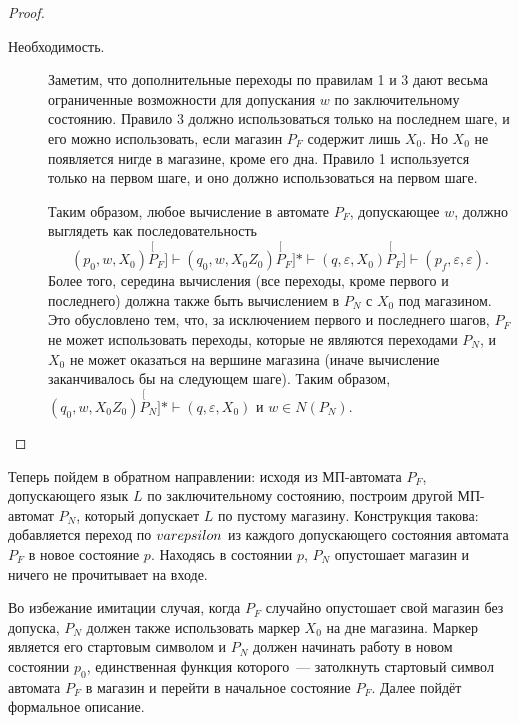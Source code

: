 \documentclass[a4paper,12pt]{article}
\begin{document}
\begin{proof}
\begin{description}
	\item[Необходимость.] Заметим, что дополнительные переходы по правилам 1 и 3 дают весьма ограниченные возможности для допускания $w$ по заключительному состоянию. Правило 3 должно использоваться только на последнем шаге, и его можно использовать, если магазин $P_F$ содержит лишь $X_0$. Но $X_0$ не появляется нигде в магазине, кроме его дна. Правило 1 используется только на первом шаге, и оно должно использоваться на первом шаге.

	Таким образом, любое вычисление в автомате $P_F$, допускающее $w$, должно выглядеть как последовательность \[(p_0, w, X_0) \stackrel[P_F]{}{\vdash} (q_0, w, X_0Z_0)  \stackrel[P_F]{*}{\vdash} (q, \varepsilon, X_0) \stackrel[P_F]{}{\vdash} (p_f, \varepsilon, \varepsilon).\] 
	Более того, середина вычисления (все переходы, кроме первого и последнего) должна также быть вычислением в $P_N$ с $X_0$ под магазином. Это обусловлено тем, что, за исключением первого и последнего шагов, $P_F$ не может использовать переходы, которые не являются переходами $P_N$, и $X_0$ не может оказаться на вершине магазина (иначе вычисление заканчивалось бы на следующем шаге). Таким образом, $(q_0, w, X_0Z_0) \stackrel[P_N]{*}{\vdash} (q, \varepsilon, X_0)$ и $w \in N(P_N)$.
\end{description}
\end{proof}

Теперь пойдем в обратном направлении: исходя из МП-автомата $P_F$, допускающего язык $L$ по заключительному состоянию, построим другой МП-автомат $P_N$, который допускает $L$ по пустому магазину. Конструкция такова: добавляется переход по $\\varepsilon$ из каждого допускающего состояния автомата $P_F$ в новое состояние $p$. Находясь в состоянии $p$, $P_N$ опустошает магазин и ничего не прочитывает на входе. 

Во избежание имитации случая, когда $P_F$ случайно опустошает свой магазин без допуска, $P_N$ должен также использовать маркер $X_0$ на дне магазина. Маркер является его стартовым символом и $P_N$ должен начинать работу в новом состоянии $p_0$, единственная функция которого~--- затолкнуть стартовый символ автомата $P_F$ в магазин и перейти в начальное состояние $P_F$. Далее пойдёт формальное описание.
\end{document}
